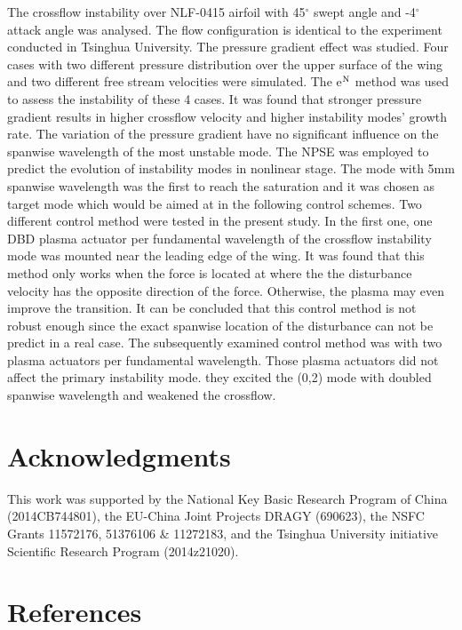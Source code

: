 \documentclass{AIAA}
\begin{document}
The crossflow instability over NLF-0415 airfoil with 45$^\circ $ swept angle and -4$^\circ $ attack angle was analysed. The flow configuration is identical to the experiment conducted in Tsinghua University. The pressure gradient effect was studied. Four cases with two different pressure distribution over the upper surface of the wing and two different free stream velocities were simulated. The e$^{\rm N}$ method was used to assess the instability of these 4 cases. It was found that stronger pressure gradient results in higher crossflow velocity and higher instability modes' growth rate. The variation of the pressure gradient have no significant influence on the spanwise wavelength of the most unstable mode. The NPSE was employed to predict the evolution of instability modes in nonlinear stage. The mode with 5mm spanwise wavelength was the first to reach the saturation and it was chosen as target mode which would be aimed at in the following control schemes. Two different control method were tested in the present study. In the first one, one DBD plasma actuator per fundamental wavelength of the crossflow instability mode was mounted near the leading edge of the wing. It was found that this method only works when the force is located at where the the disturbance velocity has the opposite direction of the force. Otherwise, the plasma may even improve the transition. It can be concluded that this control method is not robust enough since the exact spanwise location of the disturbance can not be predict in a real case. The subsequently examined control method was with two plasma actuators per fundamental wavelength. Those plasma actuators did not affect the primary instability mode. they excited the (0,2) mode with doubled spanwise wavelength and weakened the crossflow. 


\section*{Acknowledgments}
This work was supported by the National Key Basic Research Program of China (2014CB744801), the EU-China Joint Projects DRAGY (690623), the NSFC Grants 11572176, 51376106 \& 11272183, and the Tsinghua University initiative Scientific Research Program (2014z21020).

\section*{References}


\end{document}
